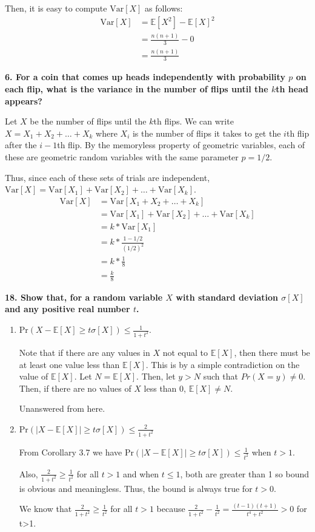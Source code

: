 \documentclass[letterpaper, 12pt]{article}
\newcommand{\E}{ \mathbb{E} }
\newcommand{\Var}{ \text{Var} }
\newcommand{\Pr}{ \text{Pr} }
\begin{document}
Then, it is easy to compute $\Var[X]$ as follows:
\begin{align*}
    \Var[X] &= \E[X^2] - \E[X]^2 \\
            &= \frac{n(n+1)}{3} - 0 \\
            &= \frac{n(n+1)}{3}
\end{align*}

\newpage
\nodindent\textbf{6. For a coin that comes up heads independently with probability $p$ on each flip, what is the variance in the number of flips until the $k$th head appears? }

Let $X$ be the number of flips until the $k$th flips. We can write $X = X_1 + X_2 + \dots + X_k$ where $X_i$ is the number of flips it takes to get the $i$th flip after the $i-1$th flip. By the memoryless property of geometric variables, each of these are geometric random variables with the same parameter $p = 1/2$.

Thus, since each of these sets of trials are independent, $\Var[X] = \Var[X_1] + \Var[X_2] + \dots + \Var[X_k]$.
\begin{align*}
    \Var[X] &= \Var[X_1 + X_2 + \dots + X_k] \\
            &= \Var[X_1] + \Var[X_2] + \dots + \Var[X_k] \\
            &= k * \Var[X_1] \\
            &= k * \frac{1-1/2}{(1/2)^2} \\
            &= k * \frac{1}{8} \\
            &= \frac{k}{8}
\end{align*}

\nodindent\textbf{18. Show that, for a random variable $X$ with standard deviation $\sigma[X]$ and any positive real number $t$.}

\begin{enumerate}
    \item $\Pr(X - \E[X] \geq t\sigma[X]) \leq \frac{1}{1+t^2}.$

        Note that if there are any values in $X$ not equal to $\E[X]$, then there must be at least one value less than $\E[X]$. This is by a simple contradiction on the value of $\E[X]$. Let $N = \E[X]$. Then, let $y > N$ such that $Pr(X=y) \not= 0$. Then, if there are no values of $X$ less than 0, $\E[X] \not= N$.
        
        
        
        Unanswered from here.

    \item $\Pr(|X - \E[X]| \geq t\sigma[X]) \leq \frac{2}{1+t^2}$
        
        From Corollary 3.7 we have $\Pr(|X - \E[X]| \geq t\sigma[X]) \leq \frac{1}{t^2}$ when $t>1$.

        Also, $\frac{2}{1 + t^2} \geq \frac{1}{t^2}$ for all $t > 1$ and when $t \leq 1$, both are greater than 1 so bound is obvious and meaningless. Thus, the bound is always true for $t>0$.

        We know that $\frac{2}{1 + t^2} \geq \frac{1}{t^2}$ for all $t > 1$ because $\frac{2}{1 + t^2} - \frac{1}{t^2} = \frac{(t-1)(t+1)}{t^4+t^2} > 0$ for t>1.
        

\end{enumerate}
\end{document}
